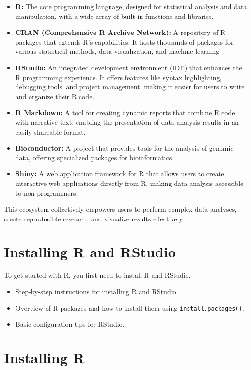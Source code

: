 \documentclass[10pt]{book}
\begin{document}
\begin{itemize}
\begin{itemize}
    \item \textbf{R:} The core programming language, designed for statistical analysis and data manipulation, with a wide array of built-in functions and libraries.
    \item \textbf{CRAN (Comprehensive R Archive Network):} A repository of R packages that extends R’s capabilities. It hosts thousands of packages for various statistical methods, data visualization, and machine learning.
    \item \textbf{RStudio:} An integrated development environment (IDE) that enhances the R programming experience. It offers features like syntax highlighting, debugging tools, and project management, making it easier for users to write and organize their R code.
    \item \textbf{R Markdown:} A tool for creating dynamic reports that combine R code with narrative text, enabling the presentation of data analysis results in an easily shareable format.
    \item \textbf{Bioconductor:} A project that provides tools for the analysis of genomic data, offering specialized packages for bioinformatics.
    \item \textbf{Shiny:} A web application framework for R that allows users to create interactive web applications directly from R, making data analysis accessible to non-programmers.
\end{itemize}

This ecosystem collectively empowers users to perform complex data analyses, create reproducible research, and visualize results effectively.


\end{itemize}

\section{Installing R and RStudio}
To get started with R, you first need to install R and RStudio.
\begin{itemize}
    \item Step-by-step instructions for installing R and RStudio.
    \item Overview of R packages and how to install them using \texttt{install.packages()}.
    \item Basic configuration tips for RStudio.
\end{itemize}

\section{Installing R}
\end{document}
